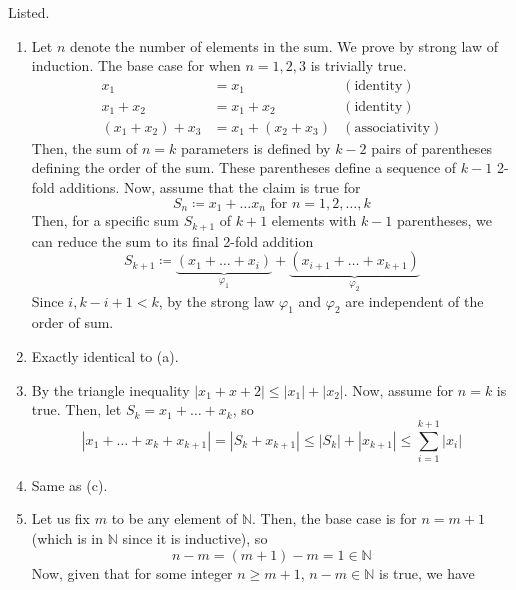   \begin{solution}
    Listed. 
    \begin{enumerate}
      \item Let $n$ denote the number of elements in the sum. We prove by strong law of induction. The base case for when $n=1, 2, 3$ is trivially true. 
      \begin{align*}
        x_1 & = x_1 & (\text{identity}) \\
        x_1 + x_2 & = x_1 + x_2 & (\text{identity}) \\
        (x_1 + x_2) + x_3 & = x_1 + (x_2 + x_3) & (\text{associativity}) 
      \end{align*}
      Then, the sum of $n=k$ parameters is defined by $k-2$ pairs of parentheses defining the order of the sum. These parentheses define a sequence of $k-1$ 2-fold additions. Now, assume that the claim is true for 
      \begin{equation}
        S_n \coloneqq x_1 + \ldots x_n \text{ for } n = 1, 2, \ldots, k
      \end{equation}
      Then, for a specific sum $S_{k+1}$ of $k+1$ elements with $k-1$ parentheses, we can reduce the sum to its final 2-fold addition 
      \begin{equation}
        S_{k+1} \coloneqq \underbrace{(x_1 + \ldots + x_i)}_{\varphi_1}  + \underbrace{(x_{i+1} + \ldots + x_{k+1})}_{\varphi_2}
      \end{equation}
      Since $i, k-i+1 < k$, by the strong law $\varphi_1$ and $\varphi_2$ are independent of the order of sum. 
      \item Exactly identical to (a). 
      \item By the triangle inequality $|x_1 + x+2| \leq |x_1| + |x_2|$. Now, assume for $n=k$ is true. Then, let $S_k = x_1 + \ldots + x_k$, so 
      \begin{equation}
        |x_1 + \ldots + x_k + x_{k+1}| = |S_k + x_{k+1}| \leq |S_k| + |x_{k+1}| \leq \sum_{i=1}^{k+1} |x_{i}|
      \end{equation}
      \item Same as (c). 
      \item Let us fix $m$ to be any element of $\mathbb{N}$. Then, the base case is for $n = m + 1$ (which is in $\mathbb{N}$ since it is inductive), so 
      \begin{equation}
        n - m = (m + 1) - m = 1 \in \mathbb{N}
      \end{equation}
      Now, given that for some integer $n \geq m+1$, $n - m \in \mathbb{N}$ is true, we have 

\end{enumerate}
\end{solution}
